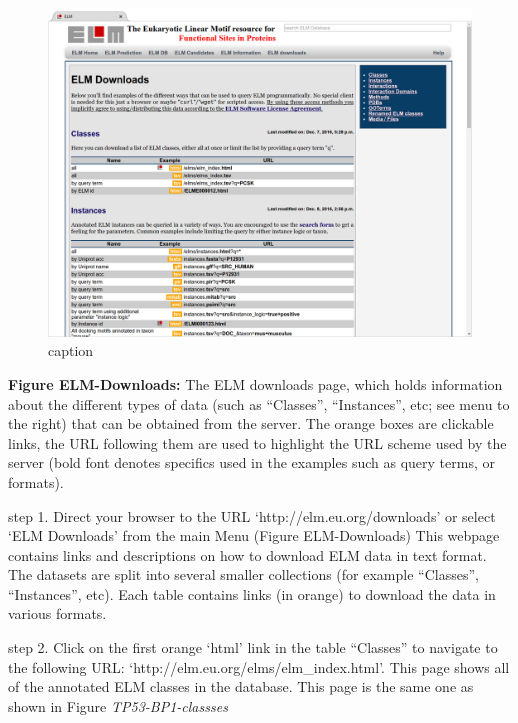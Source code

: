 \begin{figure}[htbp]
\centering
\includegraphics[width=\textwidth]{Figures/BACT_2/elm_downloads_html.png}
\caption{
caption
}
\end{figure}

\textbf{Figure ELM-Downloads:} The ELM downloads page, which holds
information about the different types of data (such as ``Classes'',
``Instances'', etc; see menu to the right) that can be obtained from the
server. The orange boxes are clickable links, the URL following them are
used to highlight the URL scheme used by the server (bold font denotes
specifics used in the examples such as query terms, or formats).

step 1. Direct your browser to the URL `http://elm.eu.org/downloads' or
select `ELM Downloads' from the main Menu (Figure ELM-Downloads) This
webpage contains links and descriptions on how to download ELM data in
text format. The datasets are split into several smaller collections
(for example ``Classes'', ``Instances'', etc). Each table contains links
(in orange) to download the data in various formats.


step 2. Click on the first orange `html' link in the table ``Classes''
to navigate to the following URL:
`http://elm.eu.org/elms/elm\_index.html'. This page shows all of the
annotated ELM classes in the database. This page is the same one as
shown in Figure \emph{TP53-BP1-classses}

